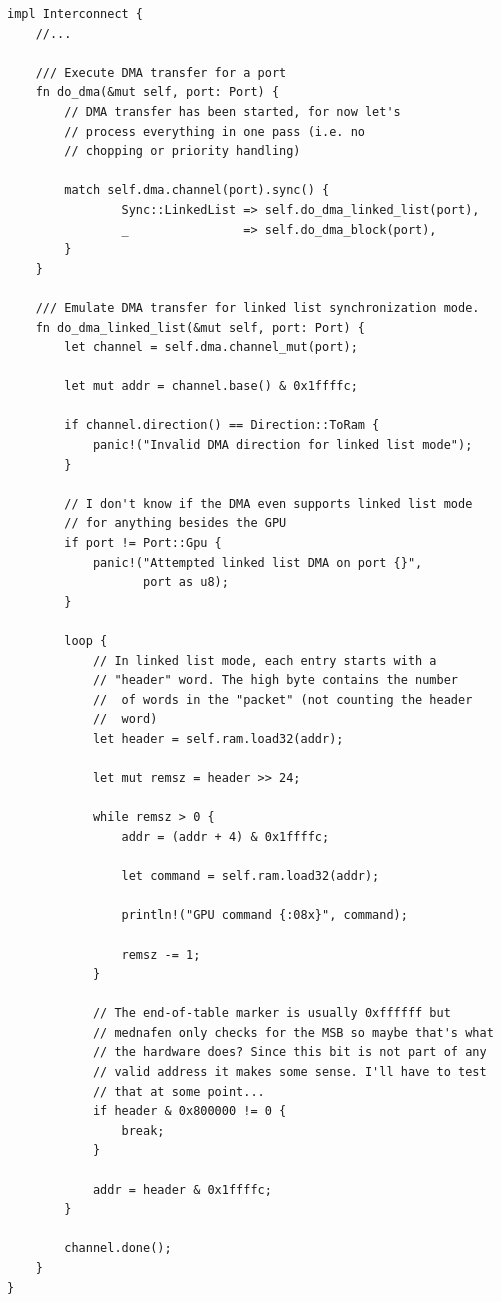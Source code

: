 \documentclass[a4paper]{article}
\begin{document}
\begin{lstlisting}
impl Interconnect {
    //...

    /// Execute DMA transfer for a port
    fn do_dma(&mut self, port: Port) {
        // DMA transfer has been started, for now let's
        // process everything in one pass (i.e. no
        // chopping or priority handling)

        match self.dma.channel(port).sync() {
                Sync::LinkedList => self.do_dma_linked_list(port),
                _                => self.do_dma_block(port),
        }
    }

    /// Emulate DMA transfer for linked list synchronization mode.
    fn do_dma_linked_list(&mut self, port: Port) {
        let channel = self.dma.channel_mut(port);

        let mut addr = channel.base() & 0x1ffffc;

        if channel.direction() == Direction::ToRam {
            panic!("Invalid DMA direction for linked list mode");
        }

        // I don't know if the DMA even supports linked list mode
        // for anything besides the GPU
        if port != Port::Gpu {
            panic!("Attempted linked list DMA on port {}",
                   port as u8);
        }

        loop {
            // In linked list mode, each entry starts with a
            // "header" word. The high byte contains the number
            //  of words in the "packet" (not counting the header
            //  word)
            let header = self.ram.load32(addr);

            let mut remsz = header >> 24;

            while remsz > 0 {
                addr = (addr + 4) & 0x1ffffc;

                let command = self.ram.load32(addr);

                println!("GPU command {:08x}", command);

                remsz -= 1;
            }

            // The end-of-table marker is usually 0xffffff but
            // mednafen only checks for the MSB so maybe that's what
            // the hardware does? Since this bit is not part of any
            // valid address it makes some sense. I'll have to test
            // that at some point...
            if header & 0x800000 != 0 {
                break;
            }

            addr = header & 0x1ffffc;
        }

        channel.done();
    }
}
\end{lstlisting}
\end{document}
